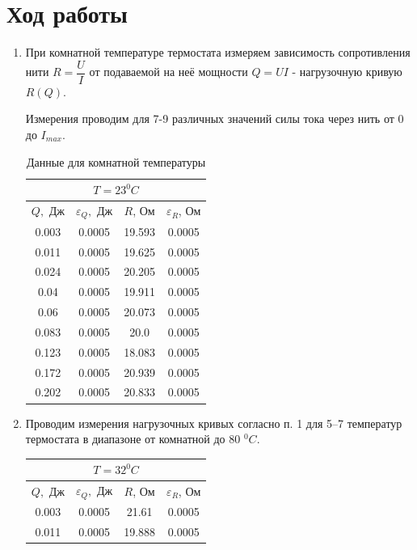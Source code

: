 \documentclass[a4paper, 12pt]{article}%
\begin{document}
\section*{Ход работы}
\begin{enumerate}
\item При комнатной температуре термостата измеряем зависимость сопротивления нити $R =\dfrac{U}{I}$ от подаваемой на неё мощности $Q = UI$ - нагрузочную кривую $R(Q)$.

Измерения проводим для 7-9 различных значений силы тока через нить от 0 до $I_{max}$.
\begin{table}[h]
\begin{center}
\begin{tabular}{|c|c|c|c|}
\hline
\multicolumn{4}{|c|}{$T = 23 ^0 C$} \\ \hline
$Q,$ Дж & $\varepsilon_Q,$ Дж & $R$, Ом & $\varepsilon_R$, Ом \\ \hline
0.003 & 0.0005 & 19.593 & 0.0005 \\ \hline
0.011 & 0.0005 & 19.625 & 0.0005 \\ \hline
0.024 & 0.0005 & 20.205 & 0.0005 \\ \hline
0.04 & 0.0005 & 19.911 & 0.0005 \\ \hline
0.06 & 0.0005 & 20.073 & 0.0005 \\ \hline
0.083 & 0.0005 & 20.0 & 0.0005 \\ \hline
0.123 & 0.0005 & 18.083 & 0.0005 \\ \hline
0.172 & 0.0005 & 20.939 & 0.0005 \\ \hline
0.202 & 0.0005 & 20.833 & 0.0005 \\ \hline
\end{tabular}
\end{center}
\caption{Данные для комнатной температуры}
\end{table} 
\item Проводим измерения нагрузочных кривых согласно п. 1 для 5–7 температур термостата в диапазоне от комнатной до 80 $^0 C$.
\begin{table}[h]
\begin{center}
\begin{tabular}{|c|c|c|c|}
\hline
\multicolumn{4}{|c|}{$T = 32 ^0 C$} \\ \hline
$Q,$ Дж & $\varepsilon_Q,$ Дж & $R$, Ом & $\varepsilon_R$, Ом \\ \hline
0.003 & 0.0005 & 21.61 & 0.0005 \\ \hline
0.011 & 0.0005 & 19.888 & 0.0005 \\ \hline

\end{tabular}
\end{center}
\end{table}
\end{enumerate}
\end{document}
